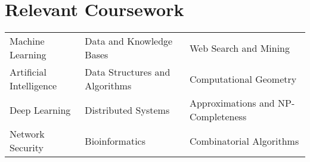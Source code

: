 \section{\sc Relevant Coursework}
\begin{tabular}{ l l l}
Machine Learning&
Data and Knowledge Bases & 
Web Search and Mining\\
Artificial Intelligence&
Data Structures and Algorithms&
Computational Geometry\\
Deep Learning&
Distributed Systems&
Approximations and NP-Completeness\\
Network Security&
Bioinformatics&
Combinatorial Algorithms\\
\end{tabular}